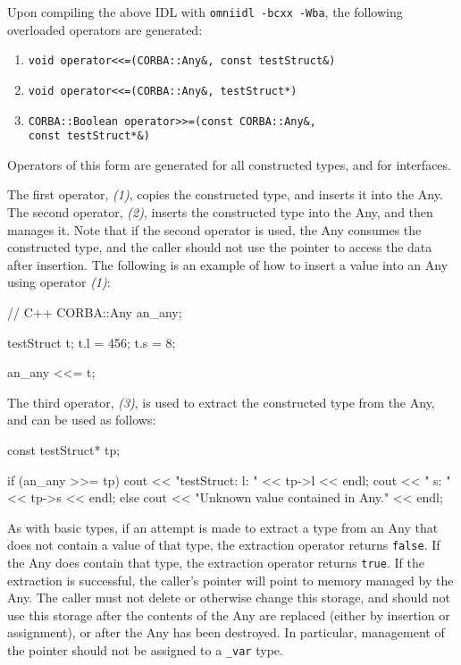 \documentclass[11pt,twoside,a4paper]{book}
\newcommand{\type}[1]{\texttt{#1}}
\newcommand{\code}[1]{\texttt{#1}}
\begin{document}
Upon compiling the above IDL with \texttt{omniidl -bcxx -Wba}, the
following overloaded operators are generated:

\begin{enumerate}
\item \verb|void operator<<=(CORBA::Any&, const testStruct&)|
\item \verb|void operator<<=(CORBA::Any&, testStruct*)|
\item \verb|CORBA::Boolean operator>>=(const CORBA::Any&,|\\
      \verb|const testStruct*&)|
\end{enumerate}

Operators of this form are generated for all constructed types, and
for interfaces.

The first operator, \emph{(1)}, copies the constructed type, and
inserts it into the Any. The second operator, \emph{(2)}, inserts the
constructed type into the Any, and then manages it. Note that if the
second operator is used, the Any consumes the constructed type, and
the caller should not use the pointer to access the data after
insertion. The following is an example of how to insert a value into
an Any using operator \emph{(1)}:

\begin{cxxlisting}
// C++
CORBA::Any an_any;

testStruct t;
t.l = 456;
t.s = 8;

an_any <<= t;
\end{cxxlisting}


The third operator, \emph{(3)}, is used to extract the constructed
type from the Any, and can be used as follows:

\begin{cxxlisting}
const testStruct* tp;

if (an_any >>= tp) {
    cout << "testStruct: l: " << tp->l << endl;
    cout << "            s: " << tp->s << endl;
}
else {
    cout << "Unknown value contained in Any." << endl;
}
\end{cxxlisting}

As with basic types, if an attempt is made to extract a type from an
Any that does not contain a value of that type, the extraction
operator returns \code{false}. If the Any does contain that type, the
extraction operator returns \code{true}. If the extraction is
successful, the caller's pointer will point to memory managed by the
Any. The caller must not delete or otherwise change this storage, and
should not use this storage after the contents of the Any are replaced
(either by insertion or assignment), or after the Any has been
destroyed. In particular, management of the pointer should not be
assigned to a \type{\_var} type.
\end{document}
